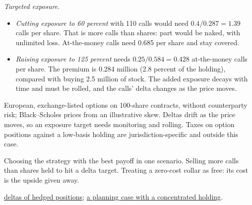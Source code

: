 \begin{qfexample}
\emph{Targeted exposure.}
\begin{itemize}
\item \emph{Cutting exposure to 60 percent} with 110 calls would need $0.4/0.287=1.39$ calls per share. That is more calls than shares: part would be naked, with unlimited loss. At-the-money calls need 0.685 per share and stay covered.
\item \emph{Raising exposure to 125 percent} needs $0.25/0.584=0.428$ at-the-money calls per share. The premium is 0.284 million (2.8 percent of the holding), compared with buying 2.5 million of stock. The added exposure decays with time and must be rolled, and the calls' delta changes as the price moves.
\end{itemize}

 European, exchange-listed options on 100-share contracts, without counterparty risk; Black--Scholes prices from an illustrative skew. Deltas drift as the price moves, so an exposure target needs monitoring and rolling. Taxes on option positions against a low-basis holding are jurisdiction-specific and outside this case.

 Choosing the strategy with the best payoff in one scenario. Selling more calls than shares held to hit a delta target. Treating a zero-cost collar as free: its cost is the upside given away.

 \hyperref[meth:option-replication-deltas]{deltas of hedged positions}; \hyperref[ex:investment-planning-case]{a planning case with a concentrated holding}.

\end{qfexample}
